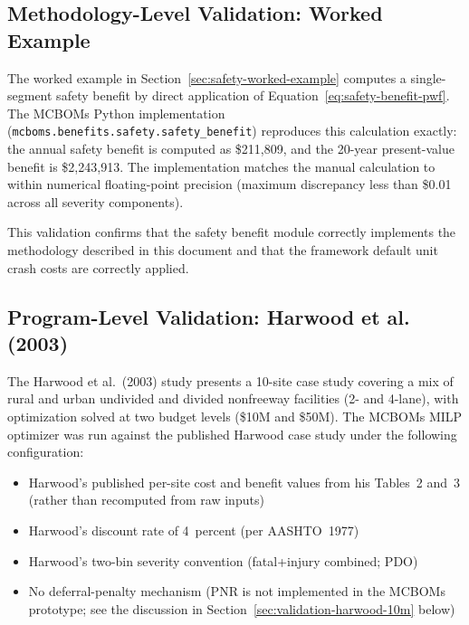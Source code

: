 \subsection{Methodology-Level Validation: Worked Example}
\label{sec:validation-worked}

The worked example in Section~\ref{sec:safety-worked-example} computes a
single-segment safety benefit by direct application of
Equation~\ref{eq:safety-benefit-pwf}. The MCBOMs Python implementation
(\texttt{mcboms.benefits.safety.safety\_benefit}) reproduces this calculation
exactly: the annual safety benefit is computed as \$211{,}809, and the
20-year present-value benefit is \$2{,}243{,}913. The implementation
matches the manual calculation to within numerical floating-point precision
(maximum discrepancy less than \$0.01 across all severity components).

This validation confirms that the safety benefit module correctly implements
the methodology described in this document and that the framework default
unit crash costs are correctly applied.

\subsection{Program-Level Validation: Harwood et al. (2003)}
\label{sec:validation-harwood}

The Harwood et al.~(2003) study presents a 10-site case study covering a mix
of rural and urban undivided and divided nonfreeway facilities (2- and
4-lane), with optimization solved at two budget levels (\$10M and \$50M).
The MCBOMs MILP optimizer was run against the published Harwood case study
under the following configuration:

\begin{itemize}[leftmargin=2em, itemsep=2pt]
  \item Harwood's published per-site cost and benefit values from his
    Tables~2 and~3 (rather than recomputed from raw inputs)
  \item Harwood's discount rate of 4~percent (per AASHTO~1977)
  \item Harwood's two-bin severity convention (fatal+injury combined; PDO)
  \item No deferral-penalty mechanism (PNR is not implemented in the MCBOMs
    prototype; see the discussion in Section~\ref{sec:validation-harwood-10m}
    below)
\end{itemize}

